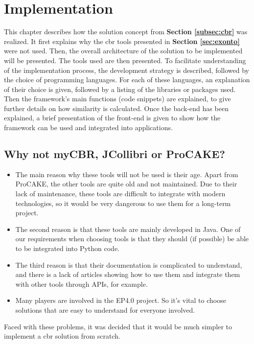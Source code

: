 \section{Implementation\label{sec:implementation}}
This chapter describes how the solution concept from \textbf{Section \ref{subsec:cbr}} was realized. It first explains why the \acrshort{cbr} tools presented in \textbf{Section \ref{sec:exonto}} were not used. Then, the overall architecture of the solution to be implemented will be presented. The tools used are then presented. To facilitate understanding of the implementation process, the development strategy is described, followed by the choice of programming languages. For each of these languages, an explanation of their choice is given, followed by a listing of the libraries or packages used. Then the framework's main functions (code snippets) are explained, to give further details on how similarity is calculated. Once the back-end has been explained, a brief presentation of the front-end is given to show how the framework can be used and integrated into applications.\\



\subsection{Why not myCBR, JCollibri or ProCAKE?\label{sec:whyNot}}
\begin{itemize}
    \item The main reason why these tools will not be used is their age. Apart from ProCAKE, the other tools are quite old and not maintained. Due to their lack of maintenance, these tools are difficult to integrate with modern technologies, so it would be very dangerous to use them for a long-term project. 
    \item The second reason is that these tools are mainly developed in Java. One of our requirements when choosing tools is that they should (if possible) be able to be integrated into Python code.
    \item The third reason is that their documentation is complicated to understand, and there is a lack of articles showing how to use them and integrate them with other tools through APIs, for example. 
    \item Many players are involved in the EP4.0 project. So it's vital to choose solutions that are easy to understand for everyone involved.\\
\end{itemize}
Faced with these problems, it was decided that it would be much simpler to implement a \acrshort{cbr} solution from scratch.



